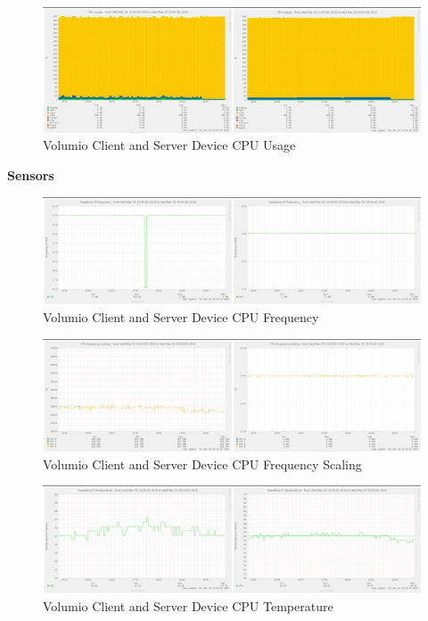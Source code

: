 \documentclass[11pt,a4paper,headinclude=false,footinclude=false]{scrreprt}
\begin{document}
\begin{figure}[H]
\includegraphics{ResultsAndAnalysis/VolumioServerTestImages/004VolumioCPUUsage.png}
\centering
\caption{Volumio Client and Server Device CPU Usage}
\label{VolumioCPUUsage}
\end{figure}

\textbf{Sensors}

\begin{figure}[H]
\includegraphics{ResultsAndAnalysis/VolumioServerTestImages/001VolumioCPUFreq.png}
\centering
\caption{Volumio Client and Server Device CPU Frequency}
\label{VolumioCPUFreq}
\end{figure}

\begin{figure}[H]
\includegraphics{ResultsAndAnalysis/VolumioServerTestImages/002VolumioCPUFreqScaling.png}
\centering
\caption{Volumio Client and Server Device CPU Frequency Scaling}
\label{VolumioCPUFreqScaling}
\end{figure}

\begin{figure}[H]
\includegraphics{ResultsAndAnalysis/VolumioServerTestImages/003VolumioCPUTemp.png}
\centering
\caption{Volumio Client and Server Device CPU Temperature}
\label{VolumioCPUTemp}
\end{figure}
\end{document}
